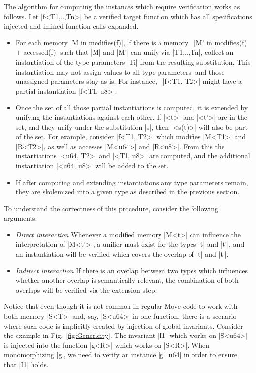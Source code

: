 The algorithm for computing the instances which require verification works as
follows. Let |f<T1,..,Tn>| be a verified target function which has all
specifications injected and inlined function calls expanded.
\begin{itemize}
\item For each memory |M in modifies(f)|, if there is a memory~%
  |M' in modifies(f) + accessed(f)| such that |M| and |M'| can unify via
  |T1,..,Tn|, collect an instantiation of the type parameters |Ti| from the
  resulting substitution. This instantiation may not assign values to all type
  parameters, and those unassigned parameters stay as is. For instance,~%
  |f<T1, T2>| might have a partial instantiation |f<T1, u8>|.
\item Once the set of all those partial instantiations is computed, it is
  extended by unifying the instantiations against each other. If |<t>| and
  |<t'>| are in the set, and they unify under the substitution |s|, then
  |<s(t)>| will also be part of the set.  For example, consider |f<T1, T2>|
  which modifies |M<T1>| and |R<T2>|, as well as accesses |M<u64>| and
  |R<u8>|. From this the instantiations |<u64, T2>| and |<T1, u8>| are computed,
  and the additional instantiation |<u64, u8>| will be added to the set.
\item If after computing and extending instantiations any type parameters
  remain, they are skolemized into a given type as described in the previous
  section.
\end{itemize}

\noindent To understand the correctness of this procedure, consider the following arguments:

\begin{itemize}
\item \emph{Direct interaction} Whenever a modified memory |M<t>| can influence
  the interpretation of |M<t'>|, a unifier must exist for the types |t| and |t'|,
  and an instantiation will be verified which covers the overlap of |t| and
  |t'|.
\item \emph{Indirect interaction} If there is an overlap between two types
  which influences whether another overlap is semantically relevant, the
  combination of both overlaps will be verified via the extension step.
\end{itemize}

Notice that even though it is not common in regular Move code to work with both
memory |S<T>| and, say, |S<u64>| in one function, there is a scenario where such
code is implicitly created by injection of global invariants. Consider the
example in Fig.~\ref{fig:Genericity}. The invariant |I1| which works on |S<u64>|
is injected into the function |g<R>| which works on |S<R>|. When monomorphizing
|g|, we need to verify an instance |g_u64| in order to ensure that |I1| holds.



